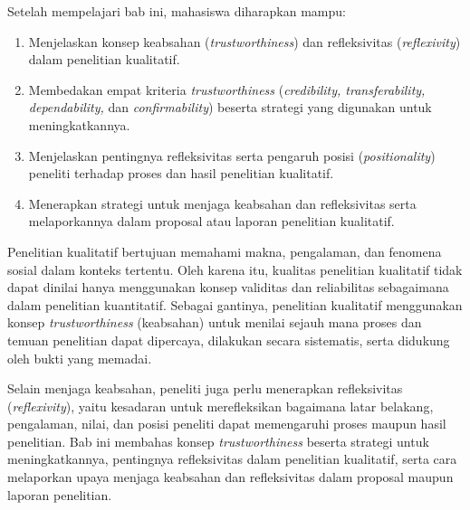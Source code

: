 \documentclass[
  indonesian,
  letterpaper,
  DIV=11,
  numbers=noendperiod]{scrreprt}
\providecommand{\tightlist}{%
  \setlength{\itemsep}{0pt}\setlength{\parskip}{0pt}}
\begin{document}
\begin{tcolorbox}[enhanced jigsaw, colframe=quarto-callout-note-color-frame, toptitle=1mm, breakable, leftrule=.75mm, arc=.35mm, toprule=.15mm, colback=white, colbacktitle=quarto-callout-note-color!10!white, bottomtitle=1mm, bottomrule=.15mm, titlerule=0mm, title=\textcolor{quarto-callout-note-color}{\faInfo}\hspace{0.5em}{Capaian Pembelajaran}, coltitle=black, left=2mm, opacitybacktitle=0.6, opacityback=0, rightrule=.15mm]

Setelah mempelajari bab ini, mahasiswa diharapkan mampu:

\begin{enumerate}
\def\labelenumi{\arabic{enumi}.}
\tightlist
\item
  Menjelaskan konsep keabsahan (\emph{trustworthiness}) dan
  refleksivitas (\emph{reflexivity}) dalam penelitian kualitatif.
\item
  Membedakan empat kriteria \emph{trustworthiness} (\emph{credibility,
  transferability, dependability,} dan \emph{confirmability}) beserta
  strategi yang digunakan untuk meningkatkannya.
\item
  Menjelaskan pentingnya refleksivitas serta pengaruh posisi
  (\emph{positionality}) peneliti terhadap proses dan hasil penelitian
  kualitatif.
\item
  Menerapkan strategi untuk menjaga keabsahan dan refleksivitas serta
  melaporkannya dalam proposal atau laporan penelitian kualitatif.
\end{enumerate}

\end{tcolorbox}

Penelitian kualitatif bertujuan memahami makna, pengalaman, dan fenomena
sosial dalam konteks tertentu. Oleh karena itu, kualitas penelitian
kualitatif tidak dapat dinilai hanya menggunakan konsep validitas dan
reliabilitas sebagaimana dalam penelitian kuantitatif. Sebagai gantinya,
penelitian kualitatif menggunakan konsep \emph{trustworthiness}
(keabsahan) untuk menilai sejauh mana proses dan temuan penelitian dapat
dipercaya, dilakukan secara sistematis, serta didukung oleh bukti yang
memadai.

Selain menjaga keabsahan, peneliti juga perlu menerapkan refleksivitas
(\emph{reflexivity}), yaitu kesadaran untuk merefleksikan bagaimana
latar belakang, pengalaman, nilai, dan posisi peneliti dapat memengaruhi
proses maupun hasil penelitian. Bab ini membahas konsep
\emph{trustworthiness} beserta strategi untuk meningkatkannya,
pentingnya refleksivitas dalam penelitian kualitatif, serta cara
melaporkan upaya menjaga keabsahan dan refleksivitas dalam proposal
maupun laporan penelitian.
\end{document}
